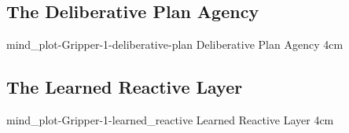 {\clearpage
  \subsection{The Deliberative Plan Agency}
  \experimentcausegroupplots{\dataappendixmaxtime}
                            {\dataappendixexperimentonemaxtime}
                            {\dataappendixexperimenttwomaxtime}
                            {\dataappendixexperimentthreemaxtime}
                            {\dataappendixexperimentonename}
                            {\dataappendixexperimenttwoname}
                            {\dataappendixexperimentthreename}
                            {\dataappendixexperimentoneprettyname}
                            {\dataappendixexperimenttwoprettyname}
                            \experimentcausegroupplotscontinued{\dataappendixexperimentthreeprettyname}
                                                               {mind_plot-Gripper-1-deliberative-plan}
                                                               {Deliberative Plan Agency}
                                                               {\experimentdatacommontablereference}
                                                               {4cm}
}
{\clearpage
  \subsection{The Learned Reactive Layer}
  \experimentcausegroupplots{\dataappendixmaxtime}
                            {\dataappendixexperimentonemaxtime}
                            {\dataappendixexperimenttwomaxtime}
                            {\dataappendixexperimentthreemaxtime}
                            {\dataappendixexperimentonename}
                            {\dataappendixexperimenttwoname}
                            {\dataappendixexperimentthreename}
                            {\dataappendixexperimentoneprettyname}
                            {\dataappendixexperimenttwoprettyname}
                            \experimentcausegroupplotscontinued{\dataappendixexperimentthreeprettyname}
                                                               {mind_plot-Gripper-1-learned_reactive}
                                                               {Learned Reactive Layer}
                                                               {\experimentdatacommontablereference}
                                                               {4cm}
}
